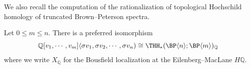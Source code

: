 We also recall the computation of the rationalization of topological Hochschild homology of truncated Brown--Peterson spectra. 

\begin{proposition}\label{prop:rational}
Let $0\le m\le n$. There is a preferred isomorphism 
\[ 
\mathbb{Q}[v_1,\cdots ,v_m]\langle\sigma v_1,\sigma v_2,\cdots ,\sigma v_n) \cong \THH_*(\BP\langle n\rangle ; \BP\langle m\rangle)_{\mathbb{Q}} 
\]
where we write $X_{\mathbb{Q}}$ for the Bousfield localization at the Eilenberg--MacLane $H\mathbb{Q}$. 
\end{proposition}
